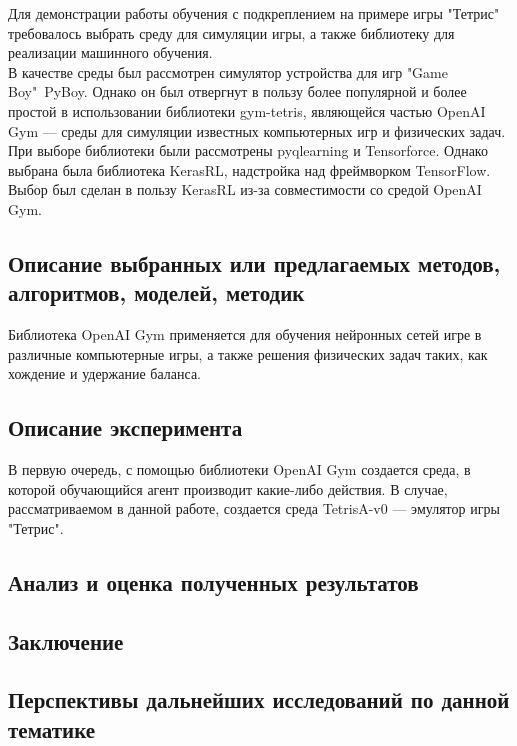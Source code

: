 \documentclass{article}
\begin{document}
Для демонстрации работы обучения с подкреплением на примере игры "Тетрис" требовалось выбрать среду для симуляции игры, а также библиотеку для реализации машинного обучения.\\
В качестве среды был рассмотрен симулятор устройства для игр "Game Boy"\ PyBoy\cite{litlink11}. Однако он был отвергнут в пользу более популярной и более простой в использовании библиотеки gym-tetris\cite{litlink12}, являющейся частью OpenAI Gym\cite{litlink13} — среды для симуляции известных компьютерных игр и физических задач.\\
При выборе библиотеки были рассмотрены pyqlearning\cite{litlink14} и Tensorforce\cite{litlink15}. Однако выбрана была библиотека KerasRL\cite{litlink16}, надстройка над фреймворком TensorFlow\cite{litlink17}. Выбор был сделан в пользу KerasRL из-за совместимости со средой OpenAI Gym.
\newpage
\begin{center}
\section {Описание выбранных или предлагаемых методов, алгоритмов, моделей, методик}
\end{center}
Библиотека OpenAI Gym применяется для обучения нейронных сетей игре в различные компьютерные игры, а также решения физических задач таких, как хождение и удержание баланса. 
\newpage
\begin{center}
\section {Описание эксперимента}
\end{center}
В первую очередь, с помощью библиотеки OpenAI Gym создается среда, в которой обучающийся агент производит какие-либо действия. В случае, рассматриваемом в данной работе, создается среда TetrisA-v0 — эмулятор игры "Тетрис". 
\newpage
\begin{center}
\section {Анализ и оценка полученных результатов}
\end{center}
\newpage
\begin{center}
\section {Заключение}
\end{center}
\newpage
\begin{center}
\section {Перспективы дальнейших исследований по данной тематике}
\end{center}
\end{document}
